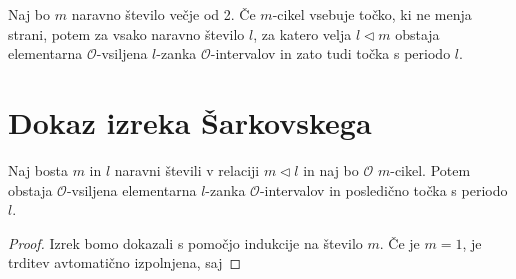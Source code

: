 \documentclass[mat2]{fmfdelo}
\begin{document}
\begin{trditev}
Naj bo $m$ naravno število večje od 2. Če $m$-cikel vsebuje točko, ki ne menja strani, potem za vsako naravno število $l$, za katero velja $l \triangleleft m$ obstaja elementarna $\mathcal{O}$-vsiljena $l$-zanka $\mathcal{O}$-intervalov in zato tudi točka s periodo $l$.
\end{trditev}
\section{Dokaz izreka Šarkovskega}

\begin{trditev}
Naj bosta $m$ in $l$ naravni števili v relaciji $m \triangleleft l$ in naj bo $\mathcal{O}$ $m$-cikel. Potem obstaja $\mathcal{O}$-vsiljena elementarna $l$-zanka $\mathcal{O}$-intervalov in posledično točka s periodo $l$.
\end{trditev}

\begin{proof}
Izrek bomo dokazali s pomočjo indukcije na število $m$. Če je $m=1$, je trditev avtomatično izpolnjena, saj 
\end{proof}

\end{document}
